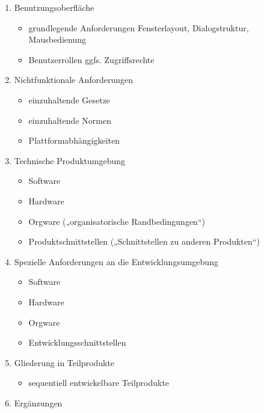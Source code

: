 \documentclass{bschlangaul-theorie}
\begin{document}
\begin{enumerate}
\item Benutzungsoberfläche

\begin{itemize}
\item grundlegende Anforderungen \zB Fensterlayout, Dialogstruktur, Mausbedienung
\item Benutzerrollen ggfs. Zugriffsrechte
\end{itemize}

\item Nichtfunktionale Anforderungen

\begin{itemize}
\item einzuhaltende Gesetze
\item einzuhaltende Normen
\item Plattformabhängigkeiten
\end{itemize}

\item Technische Produktumgebung

\begin{itemize}
\item Software
\item Hardware
\item Orgware („organisatorische Randbedingungen“)
\item Produktschnittstellen („Schnittstellen zu anderen Produkten“)
\end{itemize}

\item Spezielle Anforderungen an die Entwicklungsumgebung

\begin{itemize}
\item Software
\item Hardware
\item Orgware
\item Entwicklungsschnittstellen
\end{itemize}

\item Gliederung in Teilprodukte

\begin{itemize}
\item sequentiell entwickelbare Teilprodukte
\end{itemize}

\item Ergänzungen
\end{enumerate}

%
\end{document}
